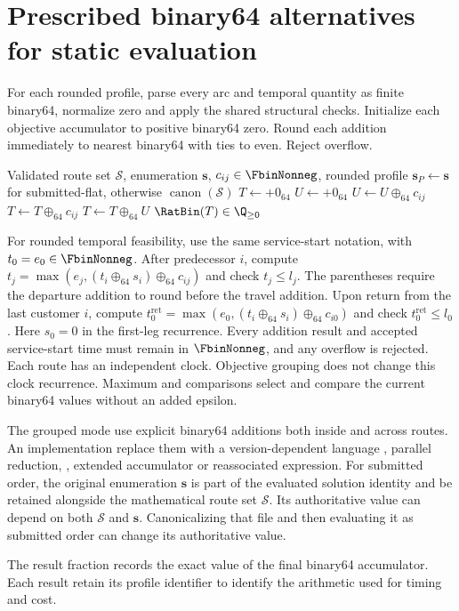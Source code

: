 \section{Prescribed binary64 alternatives for static evaluation}\label{sec:rounded}
For each rounded profile, parse every arc and temporal quantity as finite binary64, normalize zero and apply the shared structural checks. Initialize each objective accumulator to positive binary64 zero. Round each addition immediately to nearest binary64 with ties to even. Reject overflow.

\begin{algorithm}[htbp]
\caption{Binary64 objective modes after route validation}\label{alg:rounded-objective}
\begin{algorithmic}[1]
\Require Validated route set $\mathcal{S}$, enumeration $\mathbf{s}$, $c_{ij}\in\FbinNonneg$, rounded profile
\State $\mathbf{s}_P\gets\mathbf{s}$ for submitted-flat, otherwise $\operatorname{canon}(\mathcal{S})$
\State $T\gets+0_{64}$ 
\State $U\gets+0_{64}$ 
 \State $U\gets U\oplus_{64}c_{ij}$
\Else \State $T\gets T\oplus_{64}c_{ij}$ \EndIf
\EndFor
{} \State $T\gets T\oplus_{64}U$ \EndIf
\EndFor
\State \Return $\RatBin(T)\in\Q_{\geq0}$ 
\end{algorithmic}
\end{algorithm}

For rounded temporal feasibility, use the same service-start notation, with $t_0=e_0\in\FbinNonneg$. After predecessor $i$, compute $t_j=\max(e_j,(t_i\oplus_{64}s_i)\oplus_{64}c_{ij})$ and check $t_j\leq l_j$. The parentheses require the departure addition to round before the travel addition. Upon return from the last customer $i$, compute $t_0^{\mathrm{ret}}=\max(e_0,(t_i\oplus_{64}s_i)\oplus_{64}c_{i0})$ and check $t_0^{\mathrm{ret}}\leq l_0$. Here $s_0=0$ in the first-leg recurrence. Every addition result and accepted service-start time must remain in $\FbinNonneg$, and any overflow is rejected. Each route has an independent clock. Objective grouping does not change this clock recurrence. Maximum and comparisons select and compare the current binary64 values without an added epsilon.

The grouped mode \must{} use explicit binary64 additions both inside and across routes. An implementation \mustnot{} replace them with a version-dependent language , parallel reduction, , extended accumulator or reassociated expression. For submitted order, the original enumeration $\mathbf{s}$ is part of the evaluated solution identity and \must{} be retained alongside the mathematical route set $\mathcal{S}$. Its authoritative value can depend on both $\mathcal{S}$ and $\mathbf{s}$. Canonicalizing that file and then evaluating it as submitted order can change its authoritative value.

The result fraction records the exact value of the final binary64 accumulator. Each result \must{} retain its profile identifier to identify the arithmetic used for timing and cost.
